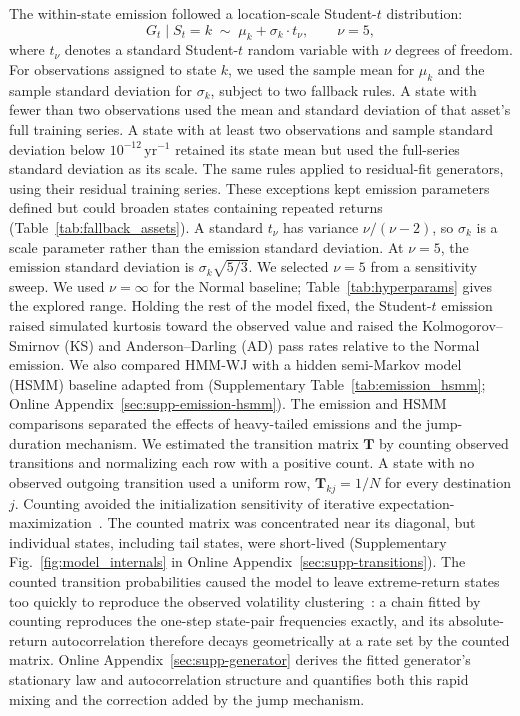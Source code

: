 The within-state emission followed a location-scale Student-$t$
distribution:
\begin{equation}
    G_t \mid S_t = k \;\sim\; \mu_k + \sigma_k \cdot t_{\nu},
    \qquad \nu = 5,
    \label{eq:emission}
\end{equation}
where $t_\nu$ denotes a standard Student-$t$ random variable with
$\nu$ degrees of freedom. For observations assigned to state $k$,
we used the sample mean for $\mu_k$ and the sample standard
deviation for $\sigma_k$, subject to two fallback rules. A state
with fewer than two observations used the mean and standard
deviation of that asset's full training series. A state with at
least two observations and sample standard deviation below $10^{-12}\,\mathrm{yr}^{-1}$
retained its state mean but used the full-series standard deviation
as its scale. The same rules applied to residual-fit generators,
using their residual training series. These exceptions kept emission
parameters defined but could broaden states containing repeated
returns (Table~\ref{tab:fallback_assets}). A standard $t_\nu$ has
variance $\nu/(\nu-2)$, so
$\sigma_k$ is a scale parameter rather than the emission standard
deviation. At $\nu=5$, the emission standard deviation is
$\sigma_k\sqrt{5/3}$. We selected $\nu = 5$ from a sensitivity sweep.
We used $\nu = \infty$ for the Normal baseline; Table~\ref{tab:hyperparams}
gives the explored range. Holding the rest of the model fixed, the
Student-$t$ emission raised simulated kurtosis toward the observed
value and raised the Kolmogorov--Smirnov (KS) and Anderson--Darling
(AD) pass rates relative to the Normal emission. We also
compared HMM-WJ with a hidden semi-Markov model (HSMM) baseline
adapted from \citet{bullaBulla2006}
(Supplementary Table~\ref{tab:emission_hsmm}; Online
Appendix~\ref{sec:supp-emission-hsmm}). The emission and HSMM
comparisons separated the effects of heavy-tailed emissions and the
jump-duration mechanism. We estimated the transition matrix $\mathbf{T}$
by counting observed transitions and normalizing each row with a
positive count. A state with no observed outgoing transition used
a uniform row, $\mathbf{T}_{kj}=1/N$ for every destination $j$.
Counting avoided the initialization sensitivity of iterative
expectation-maximization~\cite{bilmes1998}. The counted matrix was
concentrated near its diagonal, but individual states, including tail
states, were short-lived
(Supplementary Fig.~\ref{fig:model_internals} in Online
Appendix~\ref{sec:supp-transitions}). The counted transition
probabilities caused the model to leave extreme-return states too
quickly to reproduce the observed
volatility clustering~\cite{bullaBulla2006}: a chain fitted by
counting reproduces the one-step state-pair frequencies exactly, and
its absolute-return autocorrelation therefore decays geometrically at
a rate set by the counted matrix. Online
Appendix~\ref{sec:supp-generator} derives the fitted generator's
stationary law and autocorrelation structure and quantifies both this
rapid mixing and the correction added by the jump mechanism.

